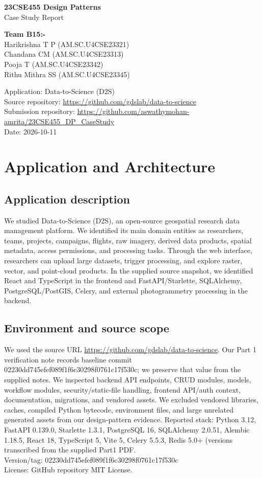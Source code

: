 \documentclass[11pt,a4paper]{article}
\begin{document}
\begin{center}{\LARGE\textbf{23CSE455 Design Patterns}}\\[4pt]{\Large Case Study Report}\end{center}

\textbf{Team B15:-}\\
Harikrishna T P (AM.SC.U4CSE23321)\\
Chandana CM (AM.SC.U4CSE23313)\\
Pooja T (AM.SC.U4CSE23342)\\
Rithu Mithra SS (AM.SC.U4CSE23345)

Application: Data-to-Science (D2S)\\
Source repository: \url{https://github.com/gdslab/data-to-science}\\
Submission repository: \url{https://github.com/aswathymohan-amrita/23CSE455_DP_CaseStudy}\\
Date: 2026-10-11

\section{Application and Architecture}
\subsection{Application description}
We studied Data-to-Science (D2S), an open-source geospatial research data management platform. We identified its main domain entities as researchers, teams, projects, campaigns, flights, raw imagery, derived data products, spatial metadata, access permissions, and processing tasks. Through the web interface, researchers can upload large datasets, trigger processing, and explore raster, vector, and point-cloud products. In the supplied source snapshot, we identified React and TypeScript in the frontend and FastAPI/Starlette, SQLAlchemy, PostgreSQL/PostGIS, Celery, and external photogrammetry processing in the backend.

\subsection{Environment and source scope}
We used the source URL \url{https://github.com/gdslab/data-to-science}. Our Part 1 verification note records baseline commit 02230dd745efef089f1f6c30298f0761c17f530c; we preserve that value from the supplied notes. We inspected backend API endpoints, CRUD modules, models, workflow modules, security/static-file handling, frontend API/auth context, documentation, migrations, and vendored assets. We excluded vendored libraries, caches, compiled Python bytecode, environment files, and large unrelated generated assets from our design-pattern evidence. Reported stack: Python 3.12, FastAPI 0.139.0, Starlette 1.3.1, PostgreSQL 16, SQLAlchemy 2.0.51, Alembic 1.18.5, React 18, TypeScript 5, Vite 5, Celery 5.5.3, Redis 5.0+ (versions transcribed from the supplied Part1 PDF.\\
Version/tag: 02230dd745efef089f1f6c30298f0761c17f530c\\
License: GitHub repository MIT License.
\end{document}

